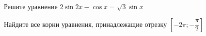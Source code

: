 \begin{ex}
	\begin{condition}
		\begin{enumcols}[label=\asbuk*)]
			\item Решите уравнение \( 2\sin 2x -\cos x=\sqrt{3}\sin x \)
			\item Найдите все корни уравнения, принадлежащие отрезку \( \left[-2\pi;-\dfrac{\pi}{2}\right] \)
		\end{enumcols}
	\end{condition}
\end{ex}